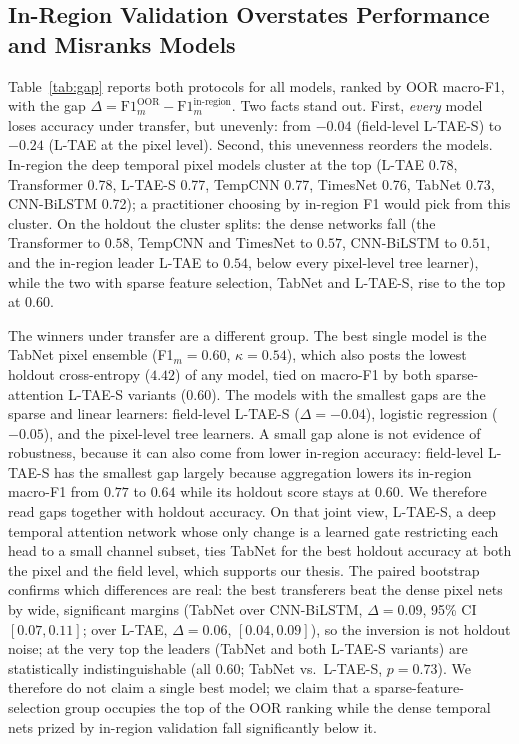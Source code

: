 \documentclass[preprint,authoryear]{elsarticle}
\begin{document}
\subsection{In-Region Validation Overstates Performance and Misranks Models}
Table~\ref{tab:gap} reports both protocols for all models, ranked by OOR macro-F1, with the gap $\Delta=\text{F1}_m^{\text{OOR}}-\text{F1}_m^{\text{in-region}}$. Two facts stand out. First, \emph{every} model loses accuracy under transfer, but unevenly: from $-0.04$ (field-level L-TAE-S) to $-0.24$ (L-TAE at the pixel level). Second, this unevenness reorders the models. In-region the deep temporal pixel models cluster at the top (L-TAE 0.78, Transformer 0.78, L-TAE-S 0.77, TempCNN 0.77, TimesNet 0.76, TabNet 0.73, CNN-BiLSTM 0.72); a practitioner choosing by in-region F1 would pick from this cluster. On the holdout the cluster splits: the dense networks fall (the Transformer to $0.58$, TempCNN and TimesNet to $0.57$, CNN-BiLSTM to $0.51$, and the in-region leader L-TAE to $0.54$, below every pixel-level tree learner), while the two with sparse feature selection, TabNet and L-TAE-S, rise to the top at $0.60$.

The winners under transfer are a different group. The best single model is the TabNet pixel ensemble (F1$_m=0.60$, $\kappa=0.54$), which also posts the lowest holdout cross-entropy ($4.42$) of any model, tied on macro-F1 by both sparse-attention L-TAE-S variants ($0.60$). The models with the smallest gaps are the sparse and linear learners: field-level L-TAE-S ($\Delta=-0.04$), logistic regression ($-0.05$), and the pixel-level tree learners. A small gap alone is not evidence of robustness, because it can also come from lower in-region accuracy: field-level L-TAE-S has the smallest gap largely because aggregation lowers its in-region macro-F1 from $0.77$ to $0.64$ while its holdout score stays at $0.60$. We therefore read gaps together with holdout accuracy. On that joint view, L-TAE-S, a deep temporal attention network whose only change is a learned gate restricting each head to a small channel subset, ties TabNet for the best holdout accuracy at both the pixel and the field level, which supports our thesis. The paired bootstrap confirms which differences are real: the best transferers beat the dense pixel nets by wide, significant margins (TabNet over CNN-BiLSTM, $\Delta=0.09$, 95\% CI $[0.07,0.11]$; over L-TAE, $\Delta=0.06$, $[0.04,0.09]$), so the inversion is not holdout noise; at the very top the leaders (TabNet and both L-TAE-S variants) are statistically indistinguishable (all $0.60$; TabNet vs.\ L-TAE-S, $p=0.73$). We therefore do not claim a single best model; we claim that a sparse-feature-selection group occupies the top of the OOR ranking while the dense temporal nets prized by in-region validation fall significantly below it.
\end{document}
